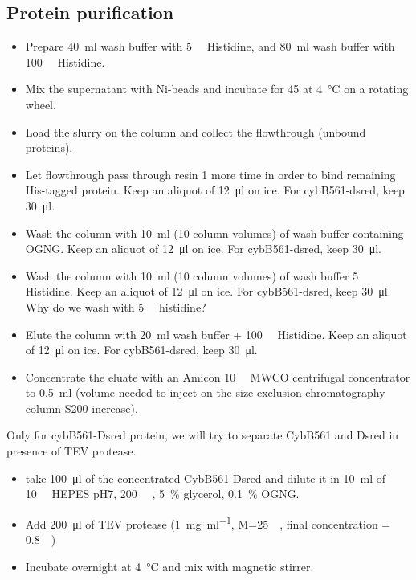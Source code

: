 \subsection{Protein purification}

\begin{itemize}
	\item Prepare \SI{40}{\ml} wash buffer with \SI{5}{\milli\Molar}
		Histidine, and \SI{80}{\ml} wash buffer with
		\SI{100}{\milli\Molar} Histidine.
	\item Mix the supernatant with Ni-beads and incubate for \SI{45}{\min}
		at \SI{4}{\celsius} on a rotating wheel.
	\item Load the slurry on the column and collect the flowthrough
		(unbound proteins).
	\item Let flowthrough pass through resin 1 more time in order to bind
		remaining His-tagged protein. Keep an aliquot of \SI{12}{\ul}
		on ice. For cybB561-dsred, keep \SI{30}{\ul}.
	\item Wash the column with \SI{10}{\ml} (10 column volumes) of wash
		buffer containing OGNG. Keep an aliquot of \SI{12}{\ul} on ice.
		For cybB561-dsred, keep \SI{30}{\ul}.
	\item Wash the column with \SI{10}{\ml} (10 column volumes) of wash
		buffer \SI{5}{\milli\Molar} Histidine. Keep an aliquot of
		\SI{12}{\ul} on ice. For cybB561-dsred, keep \SI{30}{\ul}. Why
		do we wash with \SI{5}{\milli\Molar} histidine?
	\item Elute the column with \SI{20}{\ml} wash buffer +
		\SI{100}{\milli\Molar} Histidine. Keep an aliquot of
		\SI{12}{\ul} on ice. For cybB561-dsred, keep \SI{30}{\ul}.
	\item Concentrate the eluate with an Amicon \SI{10}{\kilo\Da} MWCO
		centrifugal concentrator to \SI{0.5}{\ml} (volume needed to
		inject on the size exclusion chromatography column S200
		increase).
\end{itemize}


Only for cybB561-Dsred protein, we will try to separate CybB561 and Dsred in
presence of TEV protease.

\begin{itemize}
	\item take \SI{100}{\ul} of the concentrated CybB561-Dsred and dilute
		it in \SI{10}{\ml} of \SI{10}{\milli\Molar} HEPES pH7,
		\SI{200}{\milli\Molar} , \SI{5}{\percent} glycerol,
		\SI{0.1}{\percent} OGNG.
	\item Add \SI{200}{\ul} of TEV protease (\SI{1}{\mg\per\ml},
		M=\SI{25}{\kilo\Da}, final concentration =
		\SI{0.8}{\micro\Molar})
	\item Incubate overnight at \SI{4}{\celsius} and mix with magnetic
		stirrer.
\end{itemize}



